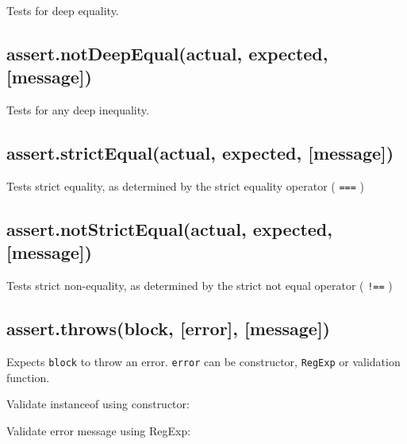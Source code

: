 Tests for deep equality.

\subsection{assert.notDeepEqual(actual, expected,
{[}message{]})}\label{assert.notdeepequalactual-expected-message}

Tests for any deep inequality.

\subsection{assert.strictEqual(actual, expected,
{[}message{]})}\label{assert.strictequalactual-expected-message}

Tests strict equality, as determined by the strict equality operator (
\texttt{===} )

\subsection{assert.notStrictEqual(actual, expected,
{[}message{]})}\label{assert.notstrictequalactual-expected-message}

Tests strict non-equality, as determined by the strict not equal
operator ( \texttt{!==} )

\subsection{assert.throws(block, {[}error{]},
{[}message{]})}\label{assert.throwsblock-error-message}

Expects \texttt{block} to throw an error. \texttt{error} can be
constructor, \texttt{RegExp} or validation function.

Validate instanceof using constructor:

\begin{Shaded}
\begin{Highlighting}[]
\NormalTok{(}
  \NormalTok{() \{}
      \NormalTok{(}\NormalTok{);}
  \NormalTok{\},}
\NormalTok{);}
\end{Highlighting}
\end{Shaded}

Validate error message using RegExp:

\begin{Shaded}
\begin{Highlighting}[]
\NormalTok{(}
  \NormalTok{() \{}
      \NormalTok{(}\NormalTok{);}
  \NormalTok{\},}
\NormalTok{);}
\end{Highlighting}
\end{Shaded}


